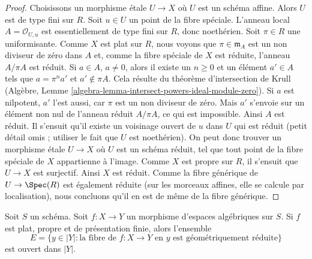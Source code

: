 \begin{proof}
Choisissons un morphisme étale $U \to X$ où $U$ est un schéma affine.
Alors $U$ est de type fini sur $R$. Soit $u \in U$ un point de la fibre spéciale.
L'anneau local $A = \mathcal{O}_{U, u}$ est essentiellement de type
fini sur $R$, donc noethérien. Soit $\pi \in R$ une uniformisante.
Comme $X$ est plat sur $R$, nous voyons que $\pi \in \mathfrak m_A$
est un non diviseur de zéro dans $A$ et, comme la fibre spéciale de $X$
est réduite, l'anneau $A/\pi A$ est réduit.
Si $a \in A$, $a \not = 0$, alors il existe un $n \geq 0$ et un élément
$a' \in A$ tels que $a = \pi^n a'$ et $a' \not \in \pi A$.
Cela résulte du théorème d'intersection de Krull
(Algèbre, Lemme \ref{algebra-lemma-intersect-powers-ideal-module-zero}).
Si $a$ est nilpotent, $a'$ l'est aussi, car $\pi$ est un non diviseur de zéro.
Mais $a'$ s'envoie sur un élément non nul de l'anneau réduit $A/\pi A$,
ce qui est impossible. Ainsi $A$ est réduit. Il s'ensuit qu'il
existe un voisinage ouvert de $u$ dans $U$ qui est réduit
(petit détail omis ; utiliser le fait que $U$ est noethérien).
On peut donc trouver un morphisme étale $U \to X$ où $U$ est un schéma
réduit, tel que tout point de la fibre spéciale de $X$ appartienne
à l'image. Comme $X$ est propre sur $R$, il s'ensuit que
$U \to X$ est surjectif. Ainsi $X$ est réduit. Comme la fibre générique de
$U \to \Spec(R)$ est également réduite (sur les morceaux affines,
elle se calcule par localisation), nous concluons qu'il en est de même
de la fibre générique.
\end{proof}

\begin{lemma}
\label{lemma-geometrically-reduced-open}
Soit $S$ un schéma. Soit $f : X \to Y$ un morphisme d'espaces
algébriques sur $S$. Si $f$ est plat, propre et de présentation finie,
alors l'ensemble
$$
E = \{y \in |Y| : \text{la fibre de }f : X \to Y\text{ en }y
\text{ est géométriquement réduite}\}
$$
est ouvert dans $|Y|$.
\end{lemma}

